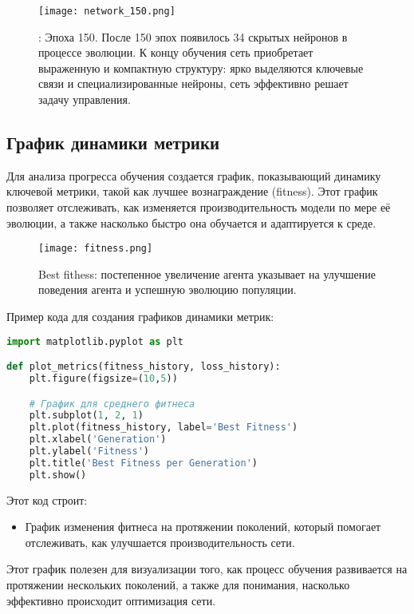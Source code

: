 \documentclass[a4paper,12pt]{article}
\begin{document}
\begin{figure}[H]
	\centering
	\texttt{[image: network\_150.png]}
	\caption{: Эпоха 150. После 150 эпох появилось 34 скрытых нейронов в процессе эволюции. К концу обучения сеть приобретает выраженную и компактную структуру: ярко выделяются  ключевые связи и специализированные нейроны, сеть эффективно решает задачу управления.}
	\label{fig:best_fitness}
\end{figure}

\subsection{График динамики метрики}

Для анализа прогресса обучения создается график, показывающий динамику ключевой метрики, такой как лучшее вознаграждение (fitness). Этот график позволяет отслеживать, как изменяется производительность модели по мере её эволюции, а также насколько быстро она обучается и адаптируется к среде.

\begin{figure}[H]
	\centering
	\texttt{[image: fitness.png]}
	\caption{Best fithess: постепенное увеличение агента указывает на улучшение поведения агента и успешную эволюцию популяции.}
	\label{fig:best_fitness}
\end{figure}

Пример кода для создания графиков динамики метрик:

\begin{lstlisting}[language=Python]
import matplotlib.pyplot as plt

def plot_metrics(fitness_history, loss_history):
    plt.figure(figsize=(10,5))

    # График для среднего фитнеса
    plt.subplot(1, 2, 1)
    plt.plot(fitness_history, label='Best Fitness')
    plt.xlabel('Generation')
    plt.ylabel('Fitness')
    plt.title('Best Fitness per Generation')
    plt.show()
\end{lstlisting}

Этот код строит:
\begin{itemize}
    \item График изменения фитнеса на протяжении поколений, который помогает отслеживать, как улучшается производительность сети.

\end{itemize}

Этот график полезен для визуализации того, как процесс обучения развивается на протяжении нескольких поколений, а также для понимания, насколько эффективно происходит оптимизация сети.
\end{document}
